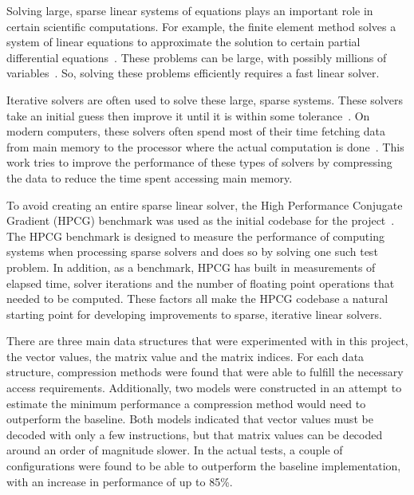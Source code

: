 Solving large, sparse linear systems of equations plays an important role in certain scientific computations.
For example, the finite element method solves a system of linear equations to approximate the solution to certain partial differential equations~\cite{Saad:2003:IterativeMethods}.
These problems can be large, with possibly millions of variables~\cite{Davis:2011:FloridaMatrixCollection}.
So, solving these problems efficiently requires a fast linear solver.

Iterative solvers are often used to solve these large, sparse systems.
These solvers take an initial guess then improve it until it is within some tolerance~\cite{Saad:2003:IterativeMethods}.
On modern computers, these solvers often spend most of their time fetching data from main memory to the processor where the actual computation is done~\cite{Lawlor:2013:compression}.
This work tries to improve the performance of these types of solvers by compressing the data to reduce the time spent accessing main memory.

To avoid creating an entire sparse linear solver, the High Performance Conjugate Gradient (HPCG) benchmark was used as the initial codebase for the project~\cite{Dongarra:2015:HPCG}.
The HPCG benchmark is designed to measure the performance of computing systems when processing sparse solvers and does so by solving one such test problem.
In addition, as a benchmark, HPCG has built in measurements of elapsed time, solver iterations and the number of floating point operations that needed to be computed.
These factors all make the HPCG codebase a natural starting point for developing improvements to sparse, iterative linear solvers.

There are three main data structures that were experimented with in this project, the vector values, the matrix value and the matrix indices.
For each data structure, compression methods were found that were able to fulfill the necessary access requirements.
Additionally, two models were constructed in an attempt to estimate the minimum performance a compression method would need to outperform the baseline.
Both models indicated that vector values must be decoded with only a few instructions, but that matrix values can be decoded around an order of magnitude slower.
In the actual tests, a couple of configurations were found to be able to outperform the baseline implementation, with an increase in performance of up to 85\%.

